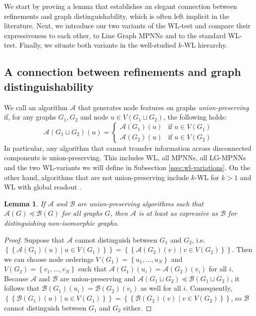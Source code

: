 \documentclass{article}
\newtheorem{lemma}[theorem]{Lemma}
\newcommand{\set}[1]{\left\{#1\right\}}
\newcommand{\multiset}[1]{\left\{\!\!\left\{#1\right\}\!\!\right\}}
\newcommand{\mca}{\mathcal{A}}
\newcommand{\mcb}{\mathcal{B}}
\begin{document}
We start by proving a lemma that establishes an elegant connection between refinements and graph distinguishability, which is often left implicit in the literature.
Next, we introduce our two variants of the WL-test and compare their expressiveness to each other, to Line Graph MPNNs and to the standard WL-test. Finally, we situate both variants in the well-studied $k$-WL hierarchy.


\subsection{A connection between refinements and graph distinguishability}

We call an algorithm $\mca$ that generates node features on graphs \emph{union-preserving} if, for any graphs $G_1,G_2$ and node $u\in V(G_1 \sqcup G_2)$, the following holds:
\begin{equation}
    \mca(G_1 \sqcup G_2)(u) = \begin{cases}
        \mca(G_1)(u) & \text{if } u\in V(G_1) \\
        \mca(G_2)(u) & \text{if } u\in V(G_2)
    \end{cases}
\end{equation}
In particular, any algorithm that cannot transfer information across disconnected components is union-preserving. This includes WL, all MPNNs, all LG-MPNNs and the two WL-variants we will define in Subsection \ref{ssec:wl-variations}. On the other hand, algorithms that are not union-preserving include $k$-WL for $k>1$ \cite{immerman1990describing} and WL with global readout \cite{barcelo2020logical}.

\begin{lemma}   \label{lemma:refinement-distinguishability}
    If $\mca$ and $\mcb$ are union-preserving algorithms such that $\mca(G) \preceq \mcb(G)$ for all graphs $G$, then $\mca$ is at least as expressive as $\mcb$ for distinguishing non-isomorphic graphs.
\end{lemma}

\begin{proof}
    Suppose that $\mca$ cannot distinguish between $G_1$ and $G_2$, i.e. $\multiset{\mca(G_1)(u) \mid u\in V(G_1)} = \multiset{\mca(G_2)(v) \mid v\in V(G_2)}$. Then we can choose node orderings $V(G_1)=\set{u_1,\dots,u_N}$ and $V(G_2)=\set{v_1,\dots,v_N}$ such that $\mca(G_1)(u_i)=\mca(G_2)(v_i)$ for all $i$. Because $\mca$ and $\mcb$ are union-preserving and $\mca(G_1 \sqcup G_2) \preceq \mcb(G_1 \sqcup G_2)$, it follows that $\mcb(G_1)(u_i)=\mcb(G_2)(v_i)$ as well for all $i$. Consequently, $\multiset{\mcb(G_1)(u) \mid u\in V(G_1)} = \multiset{\mcb(G_2)(v) \mid v\in V(G_2)}$, so $\mcb$ cannot distinguish between $G_1$ and $G_2$ either.
\end{proof}
\end{document}

